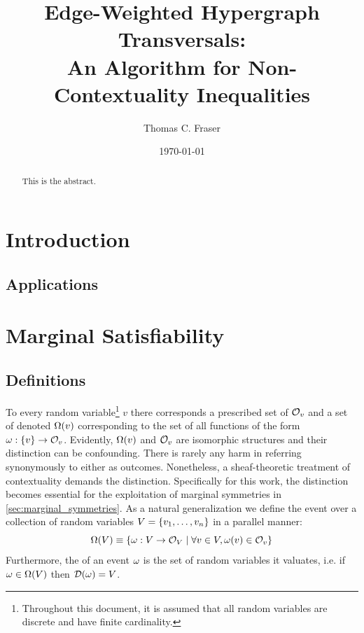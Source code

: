 \documentclass[aps, 10pt, english, twoside, twocolumn, pra, nofootinbib, tightenlines, longbibliography, superscriptaddress]{revtex4-1}
\begin{document}
    \title{
    Edge-Weighted Hypergraph Transversals: \\
    An Algorithm for Non-Contextuality Inequalities
    }
    \author{Thomas C. Fraser}
    \date{\today}
    \begin{abstract}
        This is the abstract.
    \end{abstract}
    \maketitle
    \tableofcontents

    \section{Introduction}
    \subsection{Applications}

    \section{Marginal Satisfiability}
    \subsection{Definitions}
    To every random variable\footnote{Throughout this document, it is assumed that all random variables are discrete and have finite cardinality.} $v$ there corresponds a prescribed set of  $\mathcal{O}_{v}$ and a set of  denoted $\events{v}$ corresponding to the set of all functions of the form $\w : \bc{v} \to \outcomes{v}$. Evidently, $\events{v}$ and $\mathcal{O}_{v}$ are isomorphic structures and their distinction can be confounding. There is rarely any harm in referring synonymously to either as outcomes. Nonetheless, a sheaf-theoretic treatment of contextuality \cite{Abramsky_2011} demands the distinction. Specifically for this work, the distinction becomes essential for the exploitation of marginal symmetries in \cref{sec:marginal_symmetries}. As a natural generalization we define the event over a collection of random variables $V = \bc{v_1, \ldots, v_n}$ in a parallel manner:
    \[ \events{V} \defined \bc{\w : V \to \outcomes{V} \mid \forall v \in V, \w\br{v} \in \outcomes{v}} \]
    Furthermore, the  of an event $\omega$ is the set of random variables it valuates, i.e. if $\w \in \events{V}$ then $\domain{\w} = V$.
\end{document}
